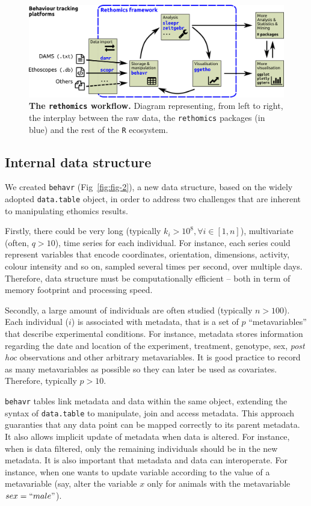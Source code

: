 \documentclass[10pt,letterpaper]{article}\usepackage[]{graphicx}\usepackage[]{color}
\begin{document}
     
\begin{figure}[!h]
    \includegraphics[width=1\textwidth]{fig/fig-1.pdf}
	\caption{{\bf The \texttt{rethomics} workflow.}
		Diagram representing, from left to right, the interplay between the raw data, the \texttt{rethomics} packages (in blue) and the rest of the \texttt{R} ecosystem.}
	\label{fig:fig-1}
\end{figure}


\subsection*{Internal data structure}
We created \texttt{behavr} (Fig~\ref{fig:fig-2}), a new data structure, based on the widely adopted \texttt{data.table} object, in order to address 
two challenges that are inherent to manipulating ethomics results.

Firstly, there could be very long (typically $k_i > 10^8, \forall i \in [1,n]$), multivariate (often, $q > 10$), time series for each individual.
For instance, each series could represent variables that encode coordinates, orientation, dimensions, activity, colour intensity and so on, sampled several times per second, over multiple days. Therefore, data structure must be computationally efficient -- both in term of memory footprint and processing speed. 

Secondly, a large amount of individuals are often studied (typically $n > 100$).
Each individual ($i$) is associated with metadata, that is a set of $p$ ``metavariables'' that describe experimental conditions.
For instance, metadata stores information regarding the date and location of the experiment, treatment, genotype, sex, \emph{post hoc} observations and other arbitrary metavariables.
It is good practice to record as many metavariables as possible so they can later be used as covariates. 
Therefore, typically $p > 10$.
 
\texttt{behavr} tables link metadata and data within the same object, extending the syntax of \texttt{data.table} to manipulate, join and access metadata.
This approach guaranties that any data point can be mapped correctly to its parent metadata.
It also allows implicit update of metadata when data is altered.
For instance, when is data filtered, only the remaining individuals should be in the new metadata. 
It is also important that metadata and data can interoperate.
For instance, when one wants to update variable according to the value of a metavariable (say, alter the variable $x$ only for animals with the metavariable $sex=``male"$).
\end{document}
